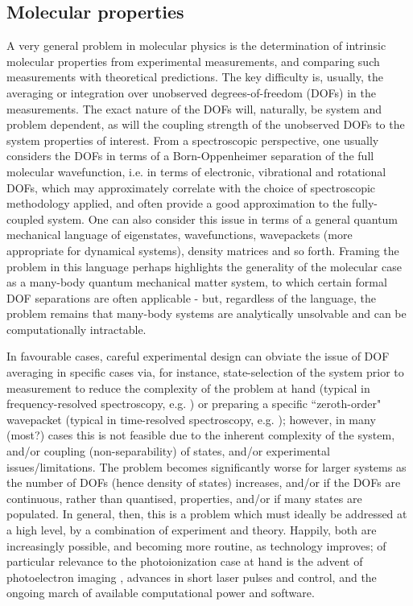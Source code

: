 \documentclass[10pt]{article}
\begin{document}
\subsection{Molecular properties}
A very general problem in molecular physics is the determination of intrinsic molecular properties from experimental measurements, and comparing such measurements with theoretical predictions. The key difficulty is, usually, the averaging or integration over unobserved degrees-of-freedom (DOFs) in the measurements. The exact nature of the DOFs will, naturally, be system and problem dependent, as will the coupling strength of the unobserved DOFs to the system properties of interest. From a spectroscopic perspective, one usually considers the DOFs in terms of a Born-Oppenheimer separation of the full molecular wavefunction, i.e. in terms of electronic, vibrational and rotational DOFs, which may approximately correlate with the choice of spectroscopic methodology applied, and often provide a good approximation to the fully-coupled system. One can also consider this issue in terms of a general quantum mechanical language of eigenstates, wavefunctions, wavepackets (more appropriate for dynamical systems), density matrices and so forth. Framing the problem in this language perhaps highlights the generality of the molecular case as a many-body quantum mechanical matter system, to which certain formal DOF separations are often applicable - but, regardless of the language, the problem remains that many-body systems are analytically unsolvable and can be computationally intractable. %

In favourable cases, careful experimental design can obviate the issue of DOF averaging in specific cases via, for instance, state-selection of the system prior to measurement to reduce the complexity of the problem at hand (typical in frequency-resolved spectroscopy, e.g. \cite{bunkerMolSymm, herzberg1945molecular, hollasHighRes}) or preparing a specific ``zeroth-order" wavepacket (typical in time-resolved spectroscopy, e.g. \cite{Tannor2007,Stolow2008,wu2011TimeresolvedPhotoelectronSpectroscopy}); however, in many (most?) cases this is not feasible due to the inherent complexity of the system, and/or coupling (non-separability) of states, and/or experimental issues/limitations. The problem becomes significantly worse for larger systems as the number of DOFs (hence density of states) increases, and/or if the DOFs are continuous, rather than quantised, properties, and/or if many states are populated. In general, then, this is a problem which must ideally be addressed at a high level, by a combination of experiment and theory. Happily, both are increasingly possible, and becoming more routine, as technology improves; of particular relevance to the photoionization case at hand is the advent of photoelectron imaging \cite{Whitaker2003}, advances in short laser pulses and control, and the ongoing march of available computational power and software.
\end{document}
